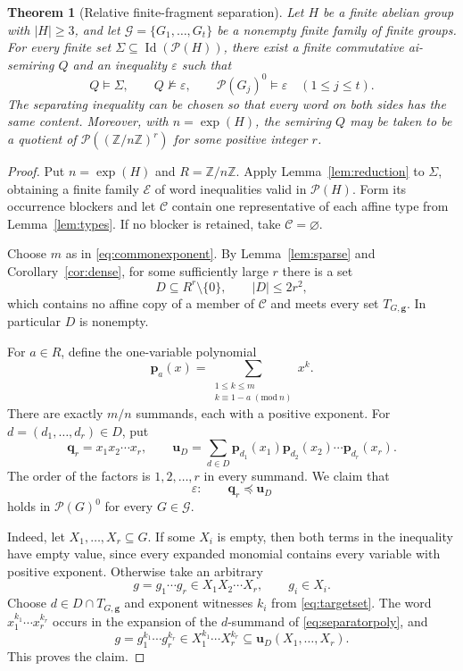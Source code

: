 \documentclass[10pt,a4paper]{amsart}
\newtheorem{theorem}{Theorem}[section]
\numberwithin{equation}{section}
\newcommand{\Pow}{\mathcal{P}}
\newcommand{\Full}[1]{\mathcal{P}(#1)^0}
\newcommand{\Id}{\operatorname{Id}}
\newcommand{\expon}{\operatorname{exp}}
\newcommand{\Z}{\mathbb{Z}}
\newcommand{\bu}{\mathbf{u}}
\newcommand{\bq}{\mathbf{q}}
\newcommand{\bp}{\mathbf{p}}
\newcommand{\calC}{\mathcal{C}}
\newcommand{\calE}{\mathcal{E}}
\newcommand{\calG}{\mathcal{G}}
\renewcommand{\leq}{\leqslant}
\renewcommand{\geq}{\geqslant}
\begin{document}
\begin{theorem}[Relative finite-fragment separation]\label{thm:relative}
Let $H$ be a finite abelian group with $|H|\geq 3$, and let $\calG=\{G_1,\ldots,G_t\}$ be a nonempty finite family of finite groups. For every finite set $\Sigma\subseteq\Id(\Pow(H))$, there exist a finite commutative ai-semiring $Q$ and an inequality $\varepsilon$ such that
\[
 Q\models\Sigma,\qquad Q\not\models\varepsilon,
 \qquad \Full{G_j}\models\varepsilon\quad(1\leq j\leq t).
\]
The separating inequality can be chosen so that every word on both sides has the same content. Moreover, with $n=\expon(H)$, the semiring $Q$ may be taken to be a quotient of $\Pow((\Z/n\Z)^r)$ for some positive integer $r$.
\end{theorem}
\begin{proof}
Put $n=\expon(H)$ and $R=\Z/n\Z$. Apply Lemma~\ref{lem:reduction} to $\Sigma$, obtaining a finite family $\calE$ of word inequalities valid in $\Pow(H)$. Form its occurrence blockers and let $\calC$ contain one representative of each affine type from Lemma~\ref{lem:types}. If no blocker is retained, take $\calC=\varnothing$.

Choose $m$ as in \eqref{eq:commonexponent}. By Lemma~\ref{lem:sparse} and Corollary~\ref{cor:dense}, for some sufficiently large $r$ there is a set
\[
 D\subseteq R^r\setminus\{0\},\qquad |D|\leq 2r^2,
\]
which contains no affine copy of a member of $\calC$ and meets every set $T_{G,\boldsymbol{g}}$. In particular $D$ is nonempty.

For $a\in R$, define the one-variable polynomial
\begin{equation}\label{eq:liftpoly}
 \bp_a(x)=\sum_{\substack{1\leq k\leq m\\ k\equiv 1-a\;(\mathrm{mod}\ n)}}x^k.
\end{equation}
There are exactly $m/n$ summands, each with a positive exponent. For $d=(d_1,\ldots,d_r)\in D$, put
\begin{equation}\label{eq:separatorpoly}
 \bq_r=x_1x_2\cdots x_r,\qquad
 \bu_D=\sum_{d\in D}\bp_{d_1}(x_1)\bp_{d_2}(x_2)\cdots \bp_{d_r}(x_r).
\end{equation}
The order of the factors is $1,2,\ldots,r$ in every summand. We claim that
\begin{equation}\label{eq:epsilon}
 \varepsilon:\qquad\bq_r\preceq\bu_D
\end{equation}
holds in $\Full{G}$ for every $G\in\calG$.

Indeed, let $X_1,\ldots,X_r\subseteq G$. If some $X_i$ is empty, then both terms in the inequality have empty value, since every expanded monomial contains every variable with positive exponent. Otherwise take an arbitrary
\[
 g=g_1\cdots g_r\in X_1X_2\cdots X_r,
 \qquad g_i\in X_i.
\]
Choose $d\in D\cap T_{G,\boldsymbol{g}}$ and exponent witnesses $k_i$ from \eqref{eq:targetset}. The word $x_1^{k_1}\cdots x_r^{k_r}$ occurs in the expansion of the $d$-summand of \eqref{eq:separatorpoly}, and
\[
 g=g_1^{k_1}\cdots g_r^{k_r}
   \in X_1^{k_1}\cdots X_r^{k_r}
   \subseteq\bu_D(X_1,\ldots,X_r).
\]
This proves the claim.


\end{proof}
\end{document}
